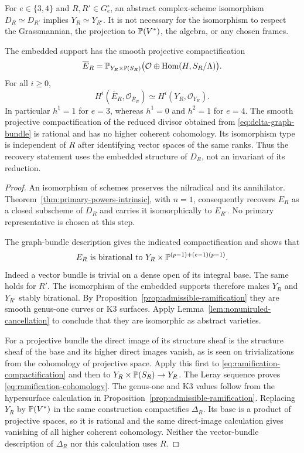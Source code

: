 \begin{theorem}
\label{thm:intrinsic-ramification-recovery}
For $e\in\{3,4\}$ and $R,R'\in G_e^\circ$, an abstract complex-scheme
isomorphism $D_R\simeq D_{R'}$ implies $Y_R\simeq Y_{R'}$.
It is not necessary for the isomorphism to respect the Grassmannian,
the projection to $\mathbb P(V^*)$, the algebra, or any chosen frames.

The embedded support has the smooth projective compactification
\begin{equation}\label{eq:ramification-compactification}
 \overline E_R=
 \mathbb P_{Y_R\times\mathbb P(S_R)}
 \bigl(\mathcal O\oplus\operatorname{Hom}(H,S_R/\Lambda)\bigr).
\end{equation}
For all $i\ge0$,
\begin{equation}\label{eq:ramification-cohomology}
 H^i(\overline E_R,\mathcal O_{\overline E_R})
       \simeq H^i(Y_R,\mathcal O_{Y_R}).
\end{equation}
In particular $h^1=1$ for $e=3$, whereas $h^1=0$ and $h^2=1$
for $e=4$. The smooth projective compactification of the reduced
divisor obtained from \eqref{eq:delta-graph-bundle} is rational
and has no higher coherent cohomology. Its isomorphism type is
independent of $R$ after identifying vector spaces of the same
ranks. Thus the recovery statement uses the embedded structure
of $D_R$, not an invariant of its reduction.
\end{theorem}
\begin{proof}
An isomorphism of schemes preserves the nilradical and its
annihilator. Theorem~\ref{thm:primary-powers-intrinsic}, with
$n=1$, consequently recovers $E_R$ as a closed subscheme of
$D_R$ and carries it isomorphically to $E_{R'}$. No primary
representative is chosen at this step.

The graph-bundle description gives the indicated compactification
and shows that
\[
 E_R\ \text{is birational to}\ 
 Y_R\times\Pj^{(p-1)+(e-1)(p-1)}.
\]
Indeed a vector bundle is trivial on a dense open of its integral
base. The same holds for $R'$. The isomorphism of the embedded
supports therefore makes $Y_R$ and $Y_{R'}$ stably birational.
By Proposition~\ref{prop:admissible-ramification} they are smooth
genus-one curves or K3 surfaces. Apply
Lemma~\ref{lem:nonuniruled-cancellation} to conclude that they
are isomorphic as abstract varieties.

For a projective bundle the direct image of its structure sheaf
is the structure sheaf of the base and its higher direct images
vanish, as is seen on trivializations from the cohomology of
projective space. Apply this first to
\eqref{eq:ramification-compactification} and then to
$Y_R\times\mathbb P(S_R)\to Y_R$. The Leray sequence proves
\eqref{eq:ramification-cohomology}. The genus-one and K3 values
follow from the hypersurface calculation in
Proposition~\ref{prop:admissible-ramification}. Replacing $Y_R$
by $\mathbb P(V^*)$ in the same construction compactifies $\Delta_R$.
Its base is a product of projective spaces, so it is rational
and the same direct-image calculation gives vanishing of all
higher coherent cohomology. Neither the vector-bundle description
of $\Delta_R$ nor this calculation uses $R$.
\end{proof}

